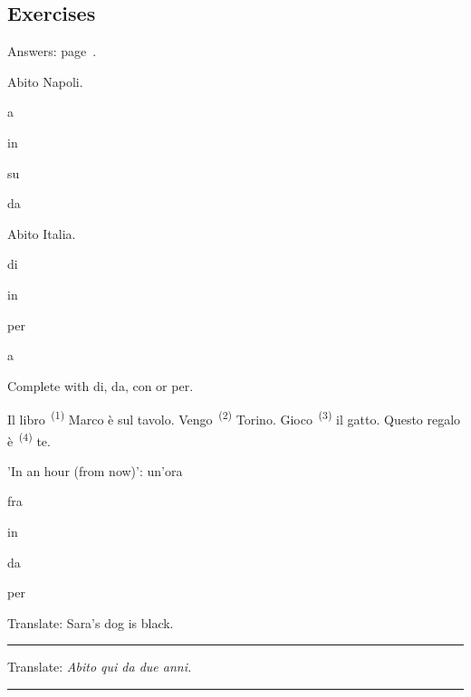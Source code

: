 \documentclass[11pt,a4paper,twoside,openright]{book}
\newcommand{\blank}{\underline{\hspace{2.6cm}}}
\newcommand{\clozeblank}[1]{\underline{\hspace{2.4cm}}\textsuperscript{\,(#1)}}
\newcommand{\answerline}{\par\vspace{6pt}\noindent\rule{0.75\linewidth}{0.4pt}\par}
\begin{document}
\subsection*{Exercises}\label{les:simple-prepositions:exercises}
{\color{muted}\small Answers: page~\pageref{ans:simple-prepositions}.}

\begin{exercises}
\item\label{ex:simple-prepositions-1}\relax Abito \blank{} Napoli.\par\nopagebreak\begin{options}
\item\relax a
\item\relax in
\item\relax su
\item\relax da
\end{options}
\item\label{ex:simple-prepositions-2}\relax Abito \blank{} Italia.\par\nopagebreak\begin{options}
\item\relax di
\item\relax in
\item\relax per
\item\relax a
\end{options}
\item\label{ex:simple-prepositions-3}\relax Complete with di, da, con or per.\par\smallskip\begingroup\setlength{\parindent}{0pt}Il libro \clozeblank{1} Marco è sul tavolo. Vengo \clozeblank{2} Torino. Gioco \clozeblank{3} il gatto. Questo regalo è \clozeblank{4} te.\par\endgroup
\item\label{ex:simple-prepositions-4}\relax 'In an hour (from now)': \blank{} un'ora\par\nopagebreak\begin{options}
\item\relax fra
\item\relax in
\item\relax da
\item\relax per
\end{options}
\item\label{ex:simple-prepositions-5}\relax Translate: Sara's dog is black.\par\answerline
\item\label{ex:simple-prepositions-6}\relax Translate: \textit{Abito qui da due anni.}\par\answerline
\end{exercises}
\end{document}
